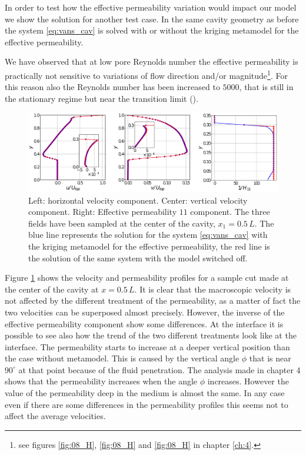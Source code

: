 In order to test how the effective permeability variation would impact our model we show the solution for another test case. In the same cavity geometry as before the system \eqref{eq:vans_cav} is solved with or without the kriging metamodel for the effective permeability.

We have observed that at low pore Reynolds number the effective permeability is practically not sensitive to variations of flow direction and/or magnitude\footnote{see figures \ref{fig:08_H}, \ref{fig:08_H} and \ref{fig:08_H} in chapter \ref{ch:4}.}.
For this reason also the Reynolds number has been increased to $5000$, that is still in the stationary regime but near the transition limit (\citet{peng2003transition}).

\begin{figure}[h]
	\centering
	\includegraphics[width=0.9\linewidth]{chapter_5/figure/cav_5000}
	\caption{Left: horizontal velocity component. Center: vertical velocity component. Right: Effective permeability $11$ component. The three fields have been sampled at the center of the cavity, $x_1=0.5 \,L$. The blue line represents the solution for the system \eqref{eq:vans_cav} with the kriging metamodel for the effective permeability, the red line is the solution of the same system with the model switched off.}
	\label{fig:cav5000}
\end{figure}

Figure \ref{fig:cav5000} shows the velocity and permeability profiles for a sample cut made at the center of the cavity at $x=0.5\,L$.
It is clear that the macroscopic velocity is not affected by the different treatment of the permeability, as a matter of fact the two velocities can be superposed almost precisely.
However, the inverse of the effective permeability component show some differences. At the interface it is possible to see also how the trend of the two different treatments look like at the interface. The permeability starts to increase at a deeper vertical position than the case without metamodel. This is caused by the vertical angle $\phi$ that is near $90^\circ$ at that point because of the fluid penetration. The analysis made in chapter 4 shows that the permeability increases when the angle $\phi$ increases.
However the value of the permeability deep in the medium is almost the same. 
In any case even if there are some differences in the permeability profiles this seems not to affect the average velocities.

